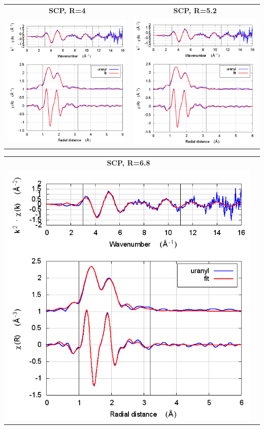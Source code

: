 \documentclass[11pt]{article}
\begin{document}
\begin{center}
  \begin{tabular}{cc}
    \textbf{SCP, R=4} & \textbf{SCP, R=5.2} \\ 
    \includegraphics[width=.45\linewidth]{uranyl/scf/fit_withSCF_4.0.png} &
    \includegraphics[width=.45\linewidth]{uranyl/scf/fit_withSCF_5.2.png} \\ 
  \end{tabular}
\end{center}
\begin{center}
  \begin{tabular}{cc}
    \textbf{SCP, R=6.8}&\\
    \includegraphics[width=.45\linewidth]{uranyl/scf/fit_withSCF_6.8.png}&\\
  \end{tabular}
\end{center}
\end{document}
